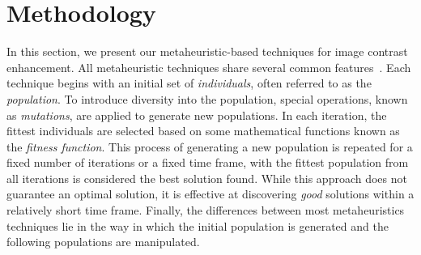 \section{Methodology}
\label{section:method}
In this section, we present our metaheuristic-based techniques for image contrast enhancement. All metaheuristic techniques share several common features~\cite{glover2003handbook}. Each technique begins with an initial set of {\em individuals}, often referred to as the {\em population}. To introduce diversity into the population, special operations, known as {\em mutations}, are applied to generate new populations. In each iteration, the fittest individuals are selected based on some mathematical functions known as the {\em fitness function}. This process of generating a new population is repeated for a fixed number of iterations or a fixed time frame, with the fittest population from all iterations is considered the best solution found. While this approach does not guarantee an optimal solution, it is effective at discovering {\em good} solutions within a relatively short time frame. Finally, the differences between most metaheuristics techniques lie in the way in which the initial population is generated and the following populations are manipulated. 

